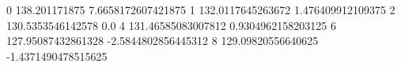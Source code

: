 0 138.201171875 7.6658172607421875
1 132.0117645263672 1.476409912109375
2 130.5353546142578 0.0
4 131.46585083007812 0.9304962158203125
6 127.95087432861328 -2.5844802856445312
8 129.09820556640625 -1.4371490478515625
